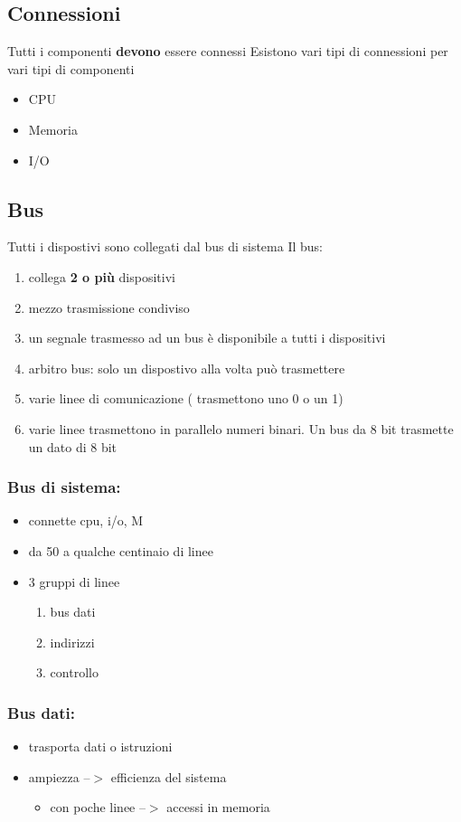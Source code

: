 \documentclass[12pt, a4paper]{article}
\begin{document}
\subsection{Connessioni}
Tutti i componenti \textbf{devono} essere connessi \newline
Esistono vari tipi di connessioni per vari tipi di componenti
\begin{itemize}
	\item CPU
	\item Memoria 
	\item I/O
\end{itemize}

\subsection{Bus}
Tutti i dispostivi sono collegati dal bus di sistema \newline
Il bus:
\begin{enumerate}
	\item collega \textbf{2 o più} dispositivi
	\item mezzo trasmissione condiviso
	\item un segnale trasmesso ad un bus è disponibile a tutti i dispositivi
	\item arbitro bus: solo un dispostivo alla volta può trasmettere
	\item varie linee di comunicazione ( trasmettono uno 0 o un 1)
	\item varie linee trasmettono in parallelo numeri binari. Un bus da 8 bit trasmette un dato di 8 bit
\end{enumerate}

\subsubsection{Bus di sistema:}
\begin{itemize}
	\item connette cpu, i/o, M
	\item da 50 a qualche centinaio di linee
	\item 3 gruppi di linee
	\begin{enumerate}
		\item bus dati
		\item indirizzi
		\item controllo
	\end{enumerate}
\end{itemize}

\subsubsection{Bus dati:}
\begin{itemize}
	\item trasporta dati o istruzioni
	\item ampiezza --$ > $ efficienza  del sistema
	\begin{itemize}
		\item con poche linee --$>$ accessi in memoria
	\end{itemize}
\end{itemize}
\end{document}
